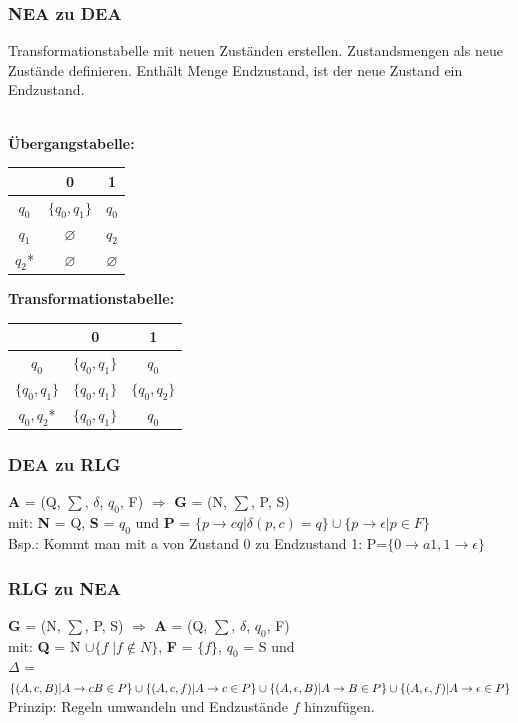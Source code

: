 \documentclass[12pt,a4paper]{article}
\begin{document}
\subsubsection{NEA zu DEA}
	Transformationstabelle mit neuen Zuständen erstellen. 
	Zustandsmengen als neue Zustände definieren. 
	Enthält Menge Endzustand, ist der neue Zustand ein Endzustand.\\\\
	\begin{minipage}[c]{0.5\textwidth}
		\textbf{Übergangstabelle:}\\
		\begin{tabular}[h]{c | c | c}
			& 0 & 1\\
			\hline
			$q_0$ & $\{q_0, q_1\}$ & $q_0$\\
			\hline
			$q_1$ & $\varnothing$ & $q_2$\\
			\hline
			$q_2$* & $\varnothing$ & $\varnothing $
		\end{tabular}
	\end{minipage}
	\hfill
	\begin{minipage}[c]{0.5\textwidth}
		\textbf{Transformationstabelle:}\\
		\begin{tabular}[h]{c | c | c}
			& 0 & 1\\
			\hline
			$q_0$ & $\{q_0, q_1\}$ & $q_0$\\
			\hline
			$\{q_0, q_1\}$ & $\{q_0, q_1\}$ & $\{q_0, q_2\}$\\
			\hline
			${q_0, q_2}$* & $\{q_0, q_1\}$ & $q_0$
		\end{tabular}
	\end{minipage}

\subsubsection{DEA zu RLG}
	\textbf{A} = (Q, $\sum$, $\delta$, $q_0$, F) $\Rightarrow$ \textbf{G} = (N, $\sum$, P, S)\\
	mit: \textbf{N} = Q, \textbf{S} = $q_0$ und \textbf{P} = $\{p \rightarrow cq | \delta (p, c) = q\} \cup \{p \rightarrow \epsilon | p \in F\}$ \\
	Bsp.: Kommt man mit a von Zustand 0 zu Endzustand 1: P=$\{ 0 \rightarrow a1, 1 \rightarrow \epsilon \}$

\subsubsection{RLG zu NEA}
	\textbf{G} = (N, $\sum$, P, S) $\Rightarrow$ \textbf{A} = (Q, $\sum$, $\delta$, $q_0$, F)  \\
	mit: \textbf{Q} = N $\cup\{f \; | f \notin N\}$, \textbf{F} = $\{f\}$, $q_0$ = S und\\
	$\Delta$ = $\{ (A, c, B) | A \rightarrow cB \in P\} \cup \\
	\{ (A, c, f) | A \rightarrow c \in P\} \cup \\
	\{ (A, \epsilon, B) | A \rightarrow B \in P\} \cup \\ 
	\{ (A, \epsilon, f) | A \rightarrow \epsilon \in P\}$
	Prinzip: Regeln umwandeln und Endzustände $f$ hinzufügen.
\end{document}
